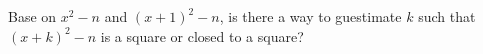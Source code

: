   Base on $x^2 - n$ and $(x + 1)^2 - n$, is there a way to guestimate
  $k$ such that
  $(x + k)^2 - n$ is a square or closed to a square?
